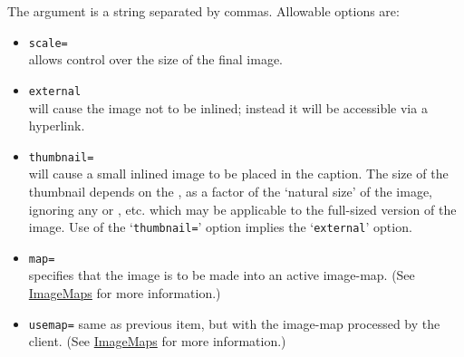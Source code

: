 \medskip\noindent
The  argument is a string separated by commas.
\html{\\}%
Allowable options are:
%
%
%
\begin{itemize}
\item \texttt{scale=}\\
allows control over the size of the final image.

\label{external}%
%
%
\item \texttt{external}\\
will cause the image not to be inlined; 
instead it will be accessible via a hyperlink. 

%
%
%
\label{thumbnail}%
\item \texttt{thumbnail=}\\
will cause a small inlined image to be placed in the caption. 
The size of the thumbnail depends on the ,
as a factor of the `natural size' of the image, ignoring
any  or , etc.
which may be applicable to the full-sized version of the image. 
Use of the `\texttt{thumbnail=}' option implies 
the `\texttt{external}' option. 

%
%
%
\item \texttt{map=}\\
specifies that the image is to be made into an 
active image-map.
(See \hyperref{another section}{Section~}{}{ImageMaps} for more information.)

\html{\\}%

\item \texttt{usemap=}
same as previous item, but with the image-map processed by the client.
(See \hyperref{another section}{Section~}{}{ImageMaps} for more information.)

\html{\\}%


\end{itemize}
